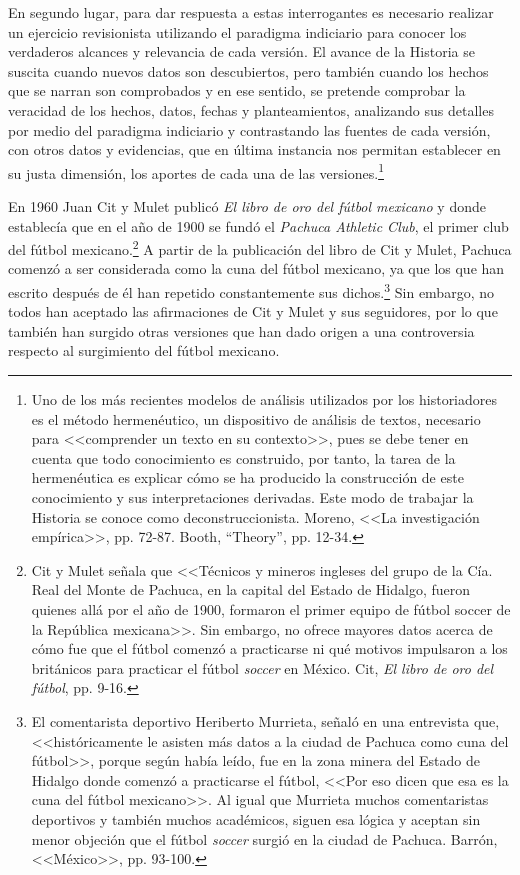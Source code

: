 \documentclass[11pt,a5paper,twoside]{book} %
\begin{document}
En segundo lugar, para dar respuesta a estas interrogantes es necesario realizar un
ejercicio revisionista utilizando el paradigma indiciario para conocer los verdaderos alcances
y relevancia de cada versión. El avance de la Historia se suscita cuando nuevos datos son
descubiertos, pero también cuando los hechos que se narran son comprobados y en ese
sentido, se pretende comprobar la veracidad de los hechos, datos, fechas y planteamientos,
analizando sus detalles por medio del paradigma indiciario y contrastando las fuentes de cada versión, con otros datos y evidencias, que en última instancia nos permitan establecer en su justa dimensión, los aportes de cada una de las versiones.\footnote{Uno de los más recientes modelos de análisis utilizados por los historiadores es el método hermenéutico, un dispositivo de análisis de textos, necesario para <<comprender un texto en su contexto>>, pues se debe tener en cuenta que todo conocimiento es construido, por tanto, la tarea de la hermenéutica es explicar cómo se ha producido la construcción de este conocimiento y sus interpretaciones derivadas. Este modo de trabajar la Historia se conoce como deconstruccionista. Moreno, <<La investigación empírica>>, pp. 72-87. Booth, ``Theory'', pp. 12-34.}

En 1960 Juan Cit y Mulet publicó \emph{El libro de oro del fútbol mexicano} y donde
establecía que en el año de 1900 se fundó el \emph{Pachuca Athletic Club}, el primer club del fútbol
mexicano.\footnote{Cit y Mulet señala que <<Técnicos y mineros ingleses del grupo de la Cía. Real del Monte de Pachuca, en la capital del Estado de Hidalgo, fueron quienes allá por el año de 1900, formaron el primer equipo de fútbol soccer de la República mexicana>>. Sin embargo, no ofrece mayores datos acerca de cómo fue que el fútbol comenzó a practicarse ni qué motivos impulsaron a los británicos para practicar el fútbol \emph{soccer} en México. Cit, \emph{El libro de oro del fútbol}, pp. 9-16.} A partir de la publicación del libro de Cit y Mulet, Pachuca comenzó a ser
considerada como la cuna del fútbol mexicano, ya que los que han escrito después de él han
repetido constantemente sus dichos.\footnote{El comentarista deportivo Heriberto Murrieta, señaló en una entrevista que, <<históricamente le asisten más datos a la ciudad de Pachuca como cuna del fútbol>>, porque según había leído, fue en la zona minera del Estado de Hidalgo donde comenzó a practicarse el fútbol, <<Por eso dicen que esa es la cuna del fútbol mexicano>>. Al igual que Murrieta muchos comentaristas deportivos y también muchos académicos, siguen esa lógica y aceptan sin menor objeción que el fútbol \emph{soccer} surgió en la ciudad de Pachuca. Barrón, <<México>>, pp. 93-100.} Sin embargo, no todos han aceptado las afirmaciones
de Cit y Mulet y sus seguidores, por lo que también han surgido otras versiones que han dado
origen a una controversia respecto al surgimiento del fútbol mexicano.
\end{document}
